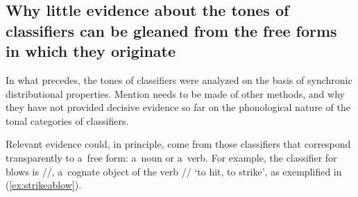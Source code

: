 \begin{figure}[h!!]
	\label{fig:tone40years}
\end{figure}

\subsection[The tones of classifiers and of corresponding free forms]{Why little evidence about the tones of classifiers can be gleaned from the free forms in which they originate}
\label{sec:nohelpfromFullForms}

In what precedes, the tones of classifiers were analyzed on the basis of synchronic distributional properties. Mention needs to be made of other methods, and why they have not provided decisive evidence so far on the phonological nature of the tonal categories of classifiers.

Relevant evidence could, in principle, come from those
classifiers that correspond transparently to a~free form: a~noun or a~verb. For example, the classifier for blows is //, a~cognate object of the verb // ‘to hit, to strike’, as exemplified in (\ref{ex:strikeablow}). 

